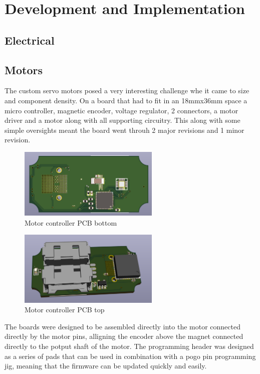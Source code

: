 \section{Development and Implementation}
\subsection{Electrical}
\subsection{Motors}
The custom servo motors posed a very interesting challenge whe it came to size and component density. On a board that had to fit in an 18mmx36mm space a micro controller, magnetic encoder, voltage regulator, 2 connectors, a motor driver and a motor along with all supporting circuitry. This along with some simple oversights meant the board went throuh 2 major revisions and 1 minor revision. 

\begin{figure}[H]
       \centering
       \includegraphics[width=0.6\textwidth]{figures/MotorControllerBottom.png}
       \caption{Motor controller PCB bottom}
       \label{fig:my_label}
   \end{figure}
   \begin{figure}[H]
       \centering
       \includegraphics[width=0.6\textwidth]{figures/MotorControllerTop.png}
       \caption{Motor controller PCB top}
       \label{fig:my_label}
   \end{figure}
The boards were designed to be assembled directly into the motor connected directly by the motor pins, alligning the encoder above the magnet connected directly to the potput shaft of the motor. The programming header was designed as a series of pads that can be used in combination with a pogo pin programming jig, meaning that the firmware can be updated quickly and easily. 
